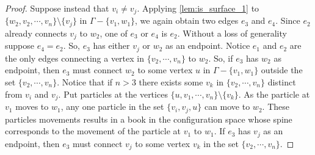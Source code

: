 \begin{proof}
    Suppose instead that \(v_i \neq v_j\).
    Applying \ref{lem:is_surface_1} to \(\{w_2, v_2, \cdots, v_n\}\setminus\{v_j\}\) in \(\Gamma - \{v_1, w_1\}\),
    we again obtain two edges \(e_3\) and \(e_4\).
    Since \(e_2\) already connects \(v_j\) to \(w_2\), one of \(e_3\) or \(e_4\) is \(e_2\).
    Without a loss of generality suppose \(e_4 = e_2\).
    So, \(e_3\) has either \(v_j\) or \(w_2\) as an endpoint.
    Notice \(e_1\) and \(e_2\) are the only edges connecting a vertex in \(\{v_2, \cdots, v_n\}\) to \(w_2\).
    So, if \(e_3\) has \(w_2\) as endpoint, then \(e_3\) must connect \(w_2\) to some vertex \(u\) in \(\Gamma - \{v_1, w_1\}\) outside the set \(\{v_2, \cdots, v_n\}\).
    Notice that if \(n > 3\) there exists some \(v_k\) in \(\{v_2, \cdots, v_n\}\) distinct from \(v_i\) and \(v_j\). Put 
    particles at the vertices \(\{u, v_1, \cdots, v_n\}\setminus\{v_k\}\). As the particle at \(v_1\) moves to \(w_1\),
    any one particle in the set \(\{v_i, v_j, u\}\) can move to \(w_2\). These particles movements results in a book
    in the configuration space whose spine corresponds to the movement of the particle at \(v_1\) to \(w_1\).
    If \(e_3\) has \(v_j\) as an endpoint, then \(e_3\) must connect \(v_j\) to some vertex \(v_k\) in the set \(\{v_2, \cdots, v_n\}\).


\end{proof}

